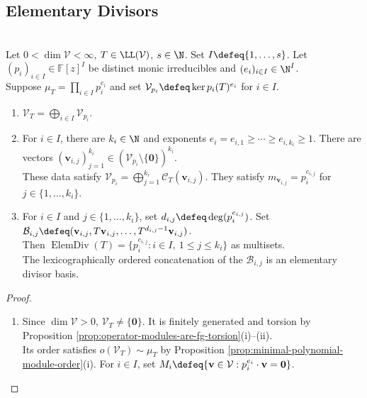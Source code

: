 \subsection{Elementary Divisors}

\begin{theorem} \label{thm:operator-primary-cyclic-decomposition} \\
Let $0<\dim\mathcal{V}<\infty$, $T\in\LL(\mathcal{V})$, $s\in\N$. Set $I\defeq\{1,\ldots,s\}$. Let $(p_i)_{i\in I}\in\mathbb{F}[z]^I$ be distinct monic irreducibles and $(e_i)_{i\in I}\in\N^I$.\\
Suppose $\mu_T=\prod\limits_{i\in I}p_i^{e_i}$ and set $\mathcal{V}_{p_i}\defeq\ker p_i(T)^{e_i}$ for $i\in I$.
\begin{enumerate}[label=(\roman*)]
\setlength{\itemsep}{0pt}
\item $\mathcal{V}_T=\bigoplus\limits_{i\in I}\mathcal{V}_{p_i}$.
\item For $i\in I$, there are $k_i\in\N$ and exponents $e_i=e_{i,1}\geq\cdots\geq e_{i,k_i}\geq1$. There are vectors $(\mathbf{v}_{i,j})_{j=1}^{k_i}\in(\mathcal{V}_{p_i}\setminus\{\mathbf{0}\})^{k_i}$.\\
These data satisfy $\mathcal{V}_{p_i}=\bigoplus\limits_{j=1}^{k_i}\mathcal{C}_T(\mathbf{v}_{i,j})$. They satisfy $m_{\mathbf{v}_{i,j}}=p_i^{e_{i,j}}$ for $j\in\{1,\ldots,k_i\}$.
\item For $i\in I$ and $j\in\{1,\ldots,k_i\}$, set $d_{i,j}\defeq\deg(p_i^{e_{i,j}})$. Set $\mathcal{B}_{i,j}\defeq(\mathbf{v}_{i,j},T\mathbf{v}_{i,j},\ldots,T^{d_{i,j}-1}\mathbf{v}_{i,j})$.\\
Then $\operatorname{ElemDiv}(T)=\{p_i^{e_{i,j}}:i\in I,\ 1\leq j\leq k_i\}$ as multisets.\\
The lexicographically ordered concatenation of the $\mathcal{B}_{i,j}$ is an elementary divisor basis.
\end{enumerate}
\begin{proof}
\begin{enumerate}[label=(\roman*)]
\setlength{\itemsep}{0pt}
\item Since $\dim\mathcal{V}>0$, $\mathcal{V}_T\neq\{\mathbf{0}\}$. It is finitely generated and torsion by Proposition \ref{prop:operator-modules-are-fg-torsion}(i)--(ii).\\
Its order satisfies $o(\mathcal{V}_T)\sim\mu_T$ by Proposition \ref{prop:minimal-polynomial-module-order}(i). For $i\in I$, set $M_i\defeq\{\mathbf{v}\in\mathcal{V}:p_i^{e_i}\cdot\mathbf{v}=\mathbf{0}\}$.\\

\end{enumerate}
\end{proof}
\end{theorem}
